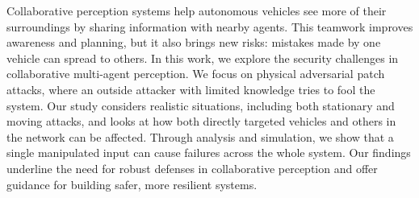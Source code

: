 
Collaborative perception systems help autonomous vehicles see more of their surroundings by sharing information with nearby agents. This teamwork improves awareness and planning, but it also brings new risks: mistakes made by one vehicle can spread to others. 
In this work, we explore the security challenges in collaborative multi-agent perception. We focus on physical adversarial patch attacks, where an outside attacker with limited knowledge tries to fool the system. Our study considers realistic situations, including both stationary and moving attacks, and looks at how both directly targeted vehicles and others in the network can be affected.
Through analysis and simulation, we show that a single manipulated input can cause failures across the whole system. Our findings underline the need for robust defenses in collaborative perception and offer guidance for building safer, more resilient systems.
